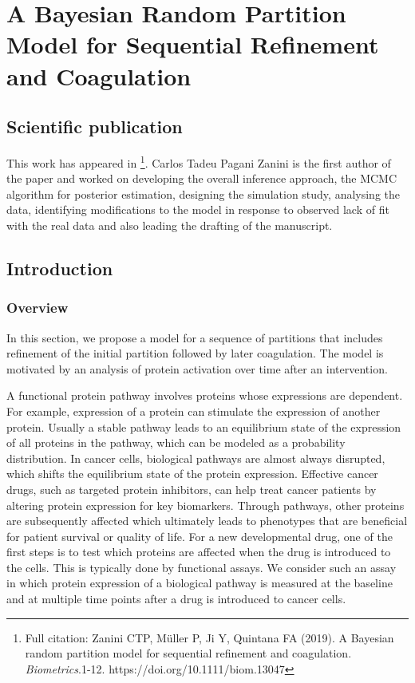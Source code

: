 
\chapter{A Bayesian Random Partition Model for Sequential Refinement and Coagulation}
\label{ch:biometrics}
%

\section{Scientific publication}

This work has appeared in \cite{zanini2019}\footnote{Full citation: Zanini CTP, M\"uller P, Ji Y, Quintana FA (2019). A Bayesian random partition model for
sequential refinement and coagulation. \textit{Biometrics}.1-12. https://doi.org/10.1111/biom.13047}. Carlos Tadeu Pagani Zanini is the first author of the paper and worked on developing the overall inference approach, the MCMC algorithm for posterior estimation, designing the simulation study, analysing the data, identifying modifications to the model in response to observed lack of fit with the real data and also leading the drafting of the manuscript.

\section{Introduction}
\label{s:intro}

\subsection{Overview}

In this section, we propose a model for a sequence of partitions that includes refinement
of the initial partition followed by later coagulation. The model is
motivated by an analysis of protein activation over time after an
intervention.

A functional protein pathway involves proteins whose expressions are
dependent. For example, expression of a protein can stimulate the
expression of another protein. Usually a stable pathway leads to an
equilibrium state of the expression of all proteins in the pathway,
which can be modeled as a probability distribution. In cancer cells,
biological pathways are almost always disrupted, which shifts the
equilibrium state of the protein expression. Effective cancer drugs, such
as targeted protein inhibitors, can help treat cancer patients by altering protein expression for key biomarkers. Through pathways, other
proteins are subsequently affected which ultimately leads to phenotypes
that are beneficial for patient survival or quality of life. For a new
developmental drug, one of the first steps is to test which proteins are
affected when the drug is introduced to the cells. This is typically done
by functional assays. We consider such an assay in which protein
expression of a biological pathway is measured at the baseline and at
multiple time points after a drug is introduced to cancer cells.

